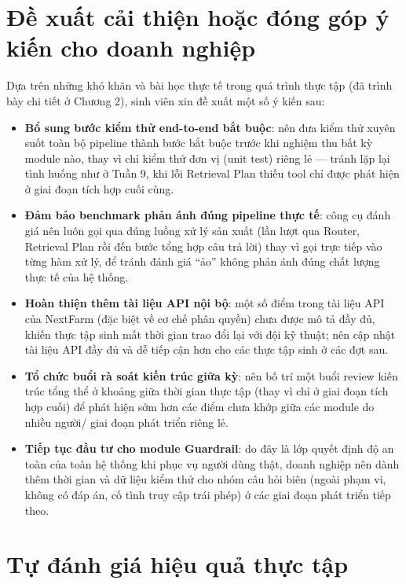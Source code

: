 \section{Đề xuất cải thiện hoặc đóng góp ý kiến cho doanh nghiệp}

Dựa trên những khó khăn và bài học thực tế trong quá trình thực tập (đã trình bày chi
tiết ở Chương 2), sinh viên xin đề xuất một số ý kiến sau:

\begin{itemize}
    \item \textbf{Bổ sung bước kiểm thử end-to-end bắt buộc}: nên đưa kiểm thử xuyên
    suốt toàn bộ pipeline thành bước bắt buộc trước khi nghiệm thu bất kỳ module nào,
    thay vì chỉ kiểm thử đơn vị (unit test) riêng lẻ — tránh lặp lại tình huống như ở
    Tuần 9, khi lỗi Retrieval Plan thiếu tool chỉ được phát hiện ở giai đoạn tích hợp
    cuối cùng.
    \item \textbf{Đảm bảo benchmark phản ánh đúng pipeline thực tế}: công cụ đánh giá
    nên luôn gọi qua đúng luồng xử lý sản xuất (lần lượt qua Router, Retrieval Plan rồi
    đến bước tổng hợp câu trả lời) thay vì gọi trực tiếp vào từng hàm xử lý, để tránh
    đánh giá ``ảo'' không phản ánh đúng chất lượng thực tế của hệ thống.
    \item \textbf{Hoàn thiện thêm tài liệu API nội bộ}: một số điểm trong tài liệu API
    của NextFarm (đặc biệt về cơ chế phân quyền) chưa được mô tả đầy đủ, khiến thực tập
    sinh mất thời gian trao đổi lại với đội kỹ thuật; nên cập nhật tài liệu API đầy đủ
    và dễ tiếp cận hơn cho các thực tập sinh ở các đợt sau.
    \item \textbf{Tổ chức buổi rà soát kiến trúc giữa kỳ}: nên bố trí một buổi review
    kiến trúc tổng thể ở khoảng giữa thời gian thực tập (thay vì chỉ ở giai đoạn tích
    hợp cuối) để phát hiện sớm hơn các điểm chưa khớp giữa các module do nhiều người/
    giai đoạn phát triển riêng lẻ.
    \item \textbf{Tiếp tục đầu tư cho module Guardrail}: do đây là lớp quyết định độ an
    toàn của toàn hệ thống khi phục vụ người dùng thật, doanh nghiệp nên dành thêm thời
    gian và dữ liệu kiểm thử cho nhóm câu hỏi biên (ngoài phạm vi, không có đáp án, cố
    tình truy cập trái phép) ở các giai đoạn phát triển tiếp theo.
\end{itemize}

\section{Tự đánh giá hiệu quả thực tập}

